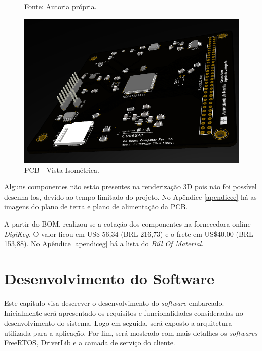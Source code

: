 \begin{figure}[h]
\footnotesize{	
	\centering
		\centering
	\footnotesize{Fonte: Autoria própria.}
	
	\includegraphics[keepaspectratio=true,scale=0.78]{figuras/pcbRealistic.PNG}
	\caption{PCB - Vista Isométrica.}
	\label{pcb_isoView}
}
\end{figure}
\FloatBarrier

Alguns componentes não estão presentes na renderização 3D pois não foi possível desenha-los, devido ao tempo limitado do projeto. No Apêndice \ref{apendicee} há as imagens do plano de terra e plano de alimentação da PCB.

A partir do BOM, realizou-se a cotação dos componentes na fornecedora online \textit{DigiKey}. O valor ficou em US\$ 56,34 (BRL 216,73) e o frete em US\$40,00 (BRL 153,88). No Apêndice \ref{apendiceg} há a lista do \textit{Bill Of Material}. 


\chapter[Desenvolvimento do Software]{Desenvolvimento do Software}
\label{secaoSoftware}
Este capítulo visa descrever o desenvolvimento do \textit{software} embarcado. Inicialmente será apresentado os requisitos e funcionalidades consideradas no desenvolvimento do sistema. Logo em seguida, será exposto a arquitetura utilizada para a aplicação. Por fim, será mostrado com mais detalhes os \textit{softwares} FreeRTOS, DriverLib e a camada de serviço do cliente. 


